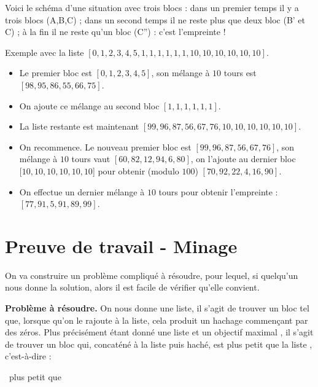 \documentclass[12pt,class=report,crop=false]{standalone}
\begin{document}
 
Voici le schéma d'une situation avec trois blocs : dans un premier temps il y a trois blocs (A,B,C) ; dans un second temps il ne reste plus que deux bloc (B' et C) ; à la fin il ne reste qu'un bloc (C'') : c'est l'empreinte !
  
\newpage
  
  Exemple avec la liste $[0,1,2,3,4,5,1,1,1,1,1,1,10,10,10,10,10,10]$.
  \begin{itemize}
    \item Le premier bloc est $[0,1,2,3,4,5]$, son mélange à $10$ tours est 
    $[98, 95, 86, 55, 66, 75]$. 
    \item On ajoute ce mélange au second bloc $[1,1,1,1,1,1]$.
    \item La liste restante est maintenant $[99,96,87,56,67,76,10,10,10,10,10,10]$.
    \item On recommence. Le nouveau premier bloc est $[99,96,87,56,67,76]$, son mélange à $10$ tours vaut $[60, 82, 12, 94, 6, 80]$, on l'ajoute au dernier bloc $[10,10,10,10,10,10$] pour obtenir (modulo $100$) $[70,92,22,4,16,90]$.
    \item On effectue un dernier mélange à $10$ tours pour obtenir l'empreinte : $[77, 91, 5, 91, 89, 99]$.
   \end{itemize}
   
   

\newpage


\section*{Preuve de travail - Minage}


On va construire un problème compliqué à résoudre, pour lequel, si quelqu'un nous donne la solution, alors il est facile de vérifier qu'elle convient.

\bigskip

\textbf{Problème à résoudre.} On nous donne une liste, il s'agit de trouver un bloc tel que, lorsque qu'on le rajoute à la liste, cela produit un hachage commençant par des zéros.
Plus précisément étant donné une liste   et un objectif maximal , il s'agit de trouver un bloc  qui, concaténé à la liste puis haché, est plus petit que la liste , c'est-à-dire : \\
\centerline{ \  plus petit que \  }
\end{document}
